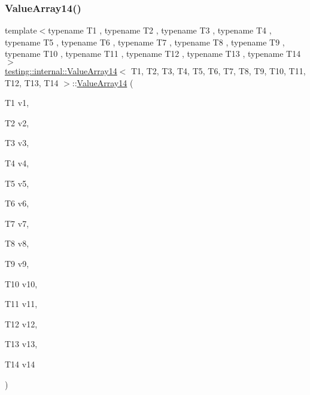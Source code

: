 \subsubsection{\texorpdfstring{ValueArray14()}{ValueArray14()}\hspace{0.1cm}{\footnotesize\ttfamily [1/2]}}
{\footnotesize\ttfamily template$<$typename T1 , typename T2 , typename T3 , typename T4 , typename T5 , typename T6 , typename T7 , typename T8 , typename T9 , typename T10 , typename T11 , typename T12 , typename T13 , typename T14 $>$ \\
\mbox{\hyperlink{classtesting_1_1internal_1_1ValueArray14}{testing\+::internal\+::\+Value\+Array14}}$<$ T1, T2, T3, T4, T5, T6, T7, T8, T9, T10, T11, T12, T13, T14 $>$\+::\mbox{\hyperlink{classtesting_1_1internal_1_1ValueArray14}{Value\+Array14}} (\begin{DoxyParamCaption}\item[{T1}]{v1,  }\item[{T2}]{v2,  }\item[{T3}]{v3,  }\item[{T4}]{v4,  }\item[{T5}]{v5,  }\item[{T6}]{v6,  }\item[{T7}]{v7,  }\item[{T8}]{v8,  }\item[{T9}]{v9,  }\item[{T10}]{v10,  }\item[{T11}]{v11,  }\item[{T12}]{v12,  }\item[{T13}]{v13,  }\item[{T14}]{v14 }\end{DoxyParamCaption})\hspace{0.3cm}{\ttfamily [inline]}}

\mbox{\label{classtesting_1_1internal_1_1ValueArray14_a41d4f0e6d12c86df58b24992a06300dc}} 
